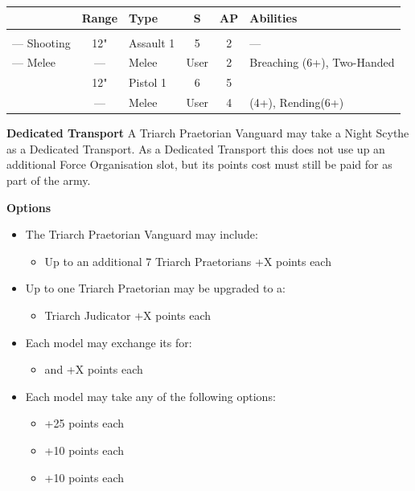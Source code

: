 \begin{minipage}[t]{0.72\textwidth}
	\begin{tabular}{L{90 pt} c C{40pt} *{2}{c} >{\raggedright\arraybackslash}p{130pt}}
		& Range & Type & S & AP & Abilities \\
		\hline
		 &  &  &  &  & \\
		— Shooting & 12" & Assault 1 & 5 & 2 & — \\
		— Melee & — & Melee & User & 2 & Breaching (6+), Two-Handed \\
		 & 12" & Pistol 1 & 6 & 5 & \\
		 & — & Melee & User & 4 &  (4+), Rending(6+) \\
	\end{tabular}
	
	\vspace*{2em}
	\textbf{Dedicated Transport}
	A Triarch Praetorian Vanguard may take a Night Scythe as a Dedicated Transport. As a Dedicated Transport this does not use up an additional Force Organisation slot, but its points cost must still be paid for as part of the army.
	
	\vspace*{2em}
	\textbf{Options}
	\begin{itemize}
		\item The Triarch Praetorian Vanguard may include:
		\begin{itemize}
			\item Up to an additional 7 Triarch Praetorians \dotfill +X points each
		\end{itemize}
		\item Up to one Triarch Praetorian may be upgraded to a:
		\begin{itemize}
			\item Triarch Judicator \dotfill +X points each
		\end{itemize}
		\item Each model may exchange its  for:
		\begin{itemize}
			\item {} and  \dotfill +X points each
		\end{itemize}
		\item Each model may take any of the following options:
		\begin{itemize}
			\item {} \dotfill +25 points each
			\item {} \dotfill +10 points each
			\item {} \dotfill +10 points each
		\end{itemize}
	\end{itemize}
\end{minipage}
\hspace{0.5em}

